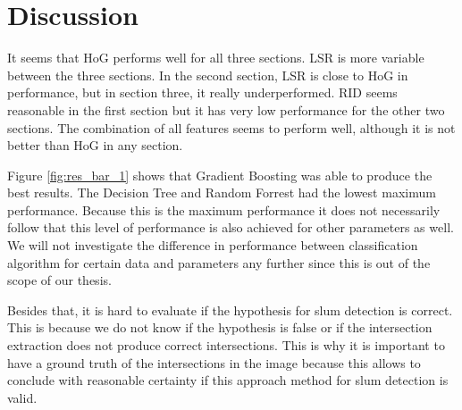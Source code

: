 \section{Discussion}








It seems that HoG performs well for all three sections. LSR is more variable between the three sections. In the second section, LSR is close to HoG in performance, but in section three, it really underperformed. RID seems reasonable in the first section but it has very low performance for the other two sections. The combination of all features seems to perform well, although it is not better than HoG in any section.

Figure \ref{fig:res_bar_1} shows that Gradient Boosting was able to produce the best results. The Decision Tree and Random Forrest had the lowest maximum performance. Because this is the maximum performance it does not necessarily follow that this level of performance is also achieved for other parameters as well. We will not investigate the difference in performance between classification algorithm for certain data and parameters any further since this is out of the scope of our thesis.


Besides that, it is hard to evaluate if the hypothesis for slum detection is correct. This is because we do not know if the hypothesis is false or if the intersection extraction does not produce correct intersections. This is why it is important to have a ground truth of the intersections in the image because this allows to conclude with reasonable certainty if this approach method for slum detection is valid.